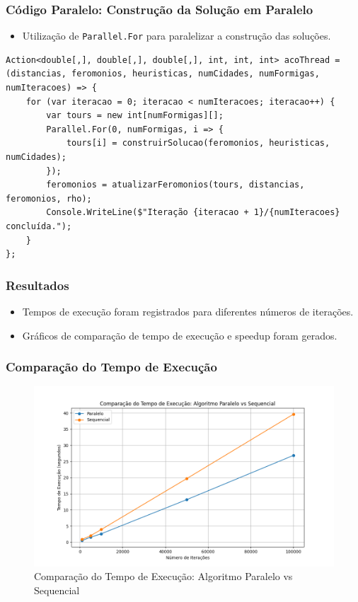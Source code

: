 \documentclass{beamer}
\begin{document}
\begin{frame}
\frametitle{Código Paralelo: Construção da Solução em Paralelo}
\begin{itemize}
    \item Utilização de \texttt{Parallel.For} para paralelizar a construção das soluções.
\end{itemize}
\begin{lstlisting}
Action<double[,], double[,], double[,], int, int, int> acoThread =
(distancias, feromonios, heuristicas, numCidades, numFormigas, numIteracoes) => {
    for (var iteracao = 0; iteracao < numIteracoes; iteracao++) {
        var tours = new int[numFormigas][];
        Parallel.For(0, numFormigas, i => {
            tours[i] = construirSolucao(feromonios, heuristicas, numCidades);
        });
        feromonios = atualizarFeromonios(tours, distancias, feromonios, rho);
        Console.WriteLine($"Iteração {iteracao + 1}/{numIteracoes} concluída.");
    }
};
\end{lstlisting}
\end{frame}

\begin{frame}
\frametitle{Resultados}
\begin{itemize}
    \item Tempos de execução foram registrados para diferentes números de iterações.
    \item Gráficos de comparação de tempo de execução e speedup foram gerados.
\end{itemize}
\end{frame}

\begin{frame}
\frametitle{Comparação do Tempo de Execução}
\begin{figure}[H]
    \centering
    \includegraphics[width=0.8\linewidth]{comparacao_tempo_execucao.png}
    \caption{Comparação do Tempo de Execução: Algoritmo Paralelo vs Sequencial}
\end{figure}
\end{frame}
\end{document}
